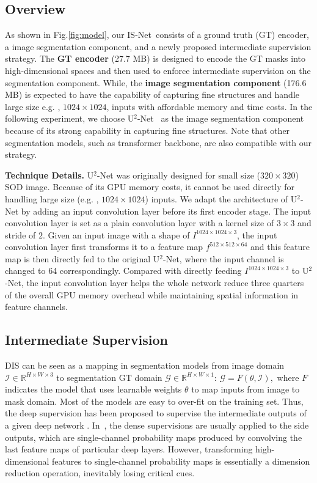\subsection{Overview}

As shown in Fig.\ref{fig:model}, our IS-Net~consists of a ground truth (GT) encoder, a image segmentation component, and a newly proposed intermediate supervision strategy. The \textbf{GT encoder} (27.7 MB) is designed to encode the GT masks into high-dimensional spaces and then used to enforce intermediate supervision on the segmentation component. While, the \textbf{image segmentation component} (176.6 MB) is expected to have the capability of capturing fine structures and handle large size e.g. , $1024\times1024$, inputs with affordable memory and time costs. In the following experiment, we choose U$^2$-Net~\cite{qin2020u2} as the image segmentation component because of its strong capability in capturing fine structures. Note that other segmentation models, such as transformer backbone, are also compatible with our strategy. 

\textbf{Technique Details.} U$^2$-Net was originally designed for small size ($320\times 320$) SOD image. Because of its GPU memory costs, it cannot be used directly for handling large size (e.g. , $1024\times 1024$) inputs. We adapt the architecture of U$^2$-Net by adding an input convolution layer before its first encoder stage. The input convolution layer is set as a plain convolution layer with a kernel size of $3\times3$ and stride of $2$. Given an input image with a shape of $I^{1024\times1024\times3}$, the input convolution layer first transforms it to a feature map $f^{512\times512\times64}$ and this feature map is then directly fed to the original U$^2$-Net, where the input channel is changed to 64 correspondingly. Compared with directly feeding $I^{1024\times1024\times3}$ to U$^2$-Net, the input convolution layer helps the whole network reduce three quarters of the overall GPU memory overhead while maintaining spatial information in feature channels. 

\subsection{Intermediate Supervision}

DIS can be seen as a mapping in segmentation models from image domain $\mathcal{I} \in \mathbb{R}^{H \times W \times 3}$ to segmentation GT domain $\mathcal{G} \in \mathbb{R}^{H \times W \times 1}$: $\mathcal{G} = F(\theta, \mathcal{I}),$ where $F$ indicates the model that uses learnable weights $\theta$ to map inputs from image to mask domain. Most of the models are easy to over-fit on the training set. Thus, the deep supervision has been proposed to supervise the intermediate outputs of a given deep network \cite{lee2015deeply}. In~\cite{xie2015holistically,qin2020u2}, the dense supervisions are usually applied to the side outputs, which are single-channel probability maps produced by convolving the last feature maps of particular deep layers. However, transforming high-dimensional features to single-channel probability maps is essentially a dimension reduction operation, inevitably losing critical cues. 

